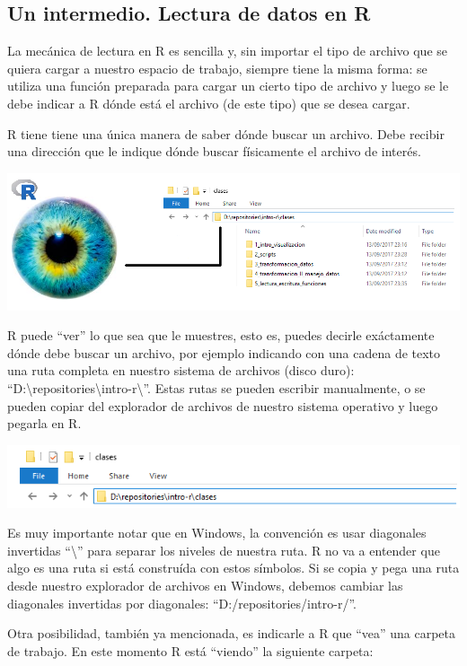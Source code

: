 \documentclass[]{book}
\theoremstyle{definition}
\theoremstyle{definition}
\theoremstyle{definition}
\theoremstyle{remark}
\begin{document}
\subsection{Un intermedio. Lectura de datos en
R}\label{un-intermedio.-lectura-de-datos-en-r}

La mecánica de lectura en R es sencilla y, sin importar el tipo de
archivo que se quiera cargar a nuestro espacio de trabajo, siempre tiene
la misma forma: se utiliza una función preparada para cargar un cierto
tipo de archivo y luego se le debe indicar a R dónde está el archivo (de
este tipo) que se desea cargar.

R tiene tiene una única manera de saber dónde buscar un archivo. Debe
recibir una dirección que le indique dónde buscar físicamente el archivo
de interés.

\includegraphics[width=13.56in]{./imagenes/1_ojo}

R puede ``ver'' lo que sea que le muestres, esto es, puedes decirle
exáctamente dónde debe buscar un archivo, por ejemplo indicando con una
cadena de texto una ruta completa en nuestro sistema de archivos (disco
duro):
``D:\textbackslash{}repositories\textbackslash{}intro-r\textbackslash{}''.
Estas rutas se pueden escribir manualmente, o se pueden copiar del
explorador de archivos de nuestro sistema operativo y luego pegarla en
R.

\includegraphics[width=9.01in]{./imagenes/2_ruta}

Es muy importante notar que en Windows, la convención es usar diagonales
invertidas ``\textbackslash{}'' para separar los niveles de nuestra
ruta. R no va a entender que algo es una ruta si está construída con
estos símbolos. Si se copia y pega una ruta desde nuestro explorador de
archivos en Windows, debemos cambiar las diagonales invertidas por
diagonales: ``D:/repositories/intro-r/''.

Otra posibilidad, también ya mencionada, es indicarle a R que ``vea''
una carpeta de trabajo. En este momento R está ``viendo'' la siguiente
carpeta:
\end{document}
